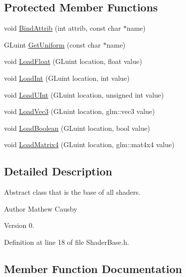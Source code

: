 \subsection*{Protected Member Functions}
\begin{DoxyCompactItemize}
\item 
void \hyperlink{class_shaders_1_1_shader_base_a532cb2422edc5f80c899d702c9f04944}{Bind\+Attrib} (int attrib, const char $\ast$name)
\item 
G\+Luint \hyperlink{class_shaders_1_1_shader_base_ae3fa1c430786dccf85b86e0337fa7f02}{Get\+Uniform} (const char $\ast$name)
\item 
void \hyperlink{class_shaders_1_1_shader_base_ad174cf85ef001561a70461b7e1717129}{Load\+Float} (G\+Luint location, float value)
\item 
void \hyperlink{class_shaders_1_1_shader_base_a039773797967696a8407df9240420464}{Load\+Int} (G\+Luint location, int value)
\item 
void \hyperlink{class_shaders_1_1_shader_base_aaf6da8cee165856e1c34fe04f415fa01}{Load\+U\+Int} (G\+Luint location, unsigned int value)
\item 
void \hyperlink{class_shaders_1_1_shader_base_a2a490771534b22d25458ce05faf275d3}{Load\+Vec3} (G\+Luint location, glm\+::vec3 value)
\item 
void \hyperlink{class_shaders_1_1_shader_base_a0f3ec02c991021e8da69c1ab885624b9}{Load\+Boolean} (G\+Luint location, bool value)
\item 
void \hyperlink{class_shaders_1_1_shader_base_ab6899eacc696db251435d3159851bbd7}{Load\+Matrix4} (G\+Luint location, glm\+::mat4x4 value)
\end{DoxyCompactItemize}


\subsection{Detailed Description}
Abstract class that is the base of all shaders. \begin{DoxyAuthor}{Author}
Mathew Causby 
\end{DoxyAuthor}
\begin{DoxyVersion}{Version}
0. 
\end{DoxyVersion}


Definition at line 18 of file Shader\+Base.\+h.



\subsection{Member Function Documentation}
\mbox{\label{class_shaders_1_1_shader_base_a532cb2422edc5f80c899d702c9f04944}} 
